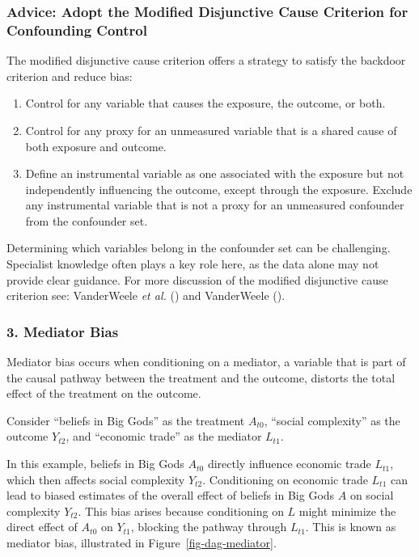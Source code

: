 \documentclass[
  singlecolumn,
  9pt]{article}
\providecommand{\tightlist}{%
  \setlength{\itemsep}{0pt}\setlength{\parskip}{0pt}}\usepackage{longtable,booktabs,array}
\begin{document}
\subsubsection{Advice: Adopt the Modified Disjunctive Cause Criterion
for Confounding
Control}\label{advice-adopt-the-modified-disjunctive-cause-criterion-for-confounding-control-1}

The modified disjunctive cause criterion offers a strategy to satisfy
the backdoor criterion and reduce bias:

\begin{enumerate}
\def\labelenumi{\alph{enumi}.}
\tightlist
\item
  Control for any variable that causes the exposure, the outcome, or
  both.
\item
  Control for any proxy for an unmeasured variable that is a shared
  cause of both exposure and outcome.
\item
  Define an instrumental variable as one associated with the exposure
  but not independently influencing the outcome, except through the
  exposure. Exclude any instrumental variable that is not a proxy for an
  unmeasured confounder from the confounder set.
\end{enumerate}

Determining which variables belong in the confounder set can be
challenging. Specialist knowledge often plays a key role here, as the
data alone may not provide clear guidance. For more discussion of the
modified disjunctive cause criterion see: VanderWeele \emph{et al.}
() and VanderWeele
().

\subsubsection{3. Mediator Bias}\label{mediator-bias}

Mediator bias occurs when conditioning on a mediator, a variable that is
part of the causal pathway between the treatment and the outcome,
distorts the total effect of the treatment on the outcome.

Consider ``beliefs in Big Gods'' as the treatment \(A_{t0}\), ``social
complexity'' as the outcome \(Y_{t2}\), and ``economic trade'' as the
mediator \(L_{t1}\).

In this example, beliefs in Big Gods \(A_{t0}\) directly influence
economic trade \(L_{t1}\), which then affects social complexity
\(Y_{t2}\). Conditioning on economic trade \(L_{t1}\) can lead to biased
estimates of the overall effect of beliefs in Big Gods \(A\) on social
complexity \(Y_{t2}\). This bias arises because conditioning on \(L\)
might minimize the direct effect of \(A_{t0}\) on \(Y_{t1}\), blocking
the pathway through \(L_{t1}\). This is known as mediator bias,
illustrated in Figure~\ref{fig-dag-mediator}.
\end{document}
